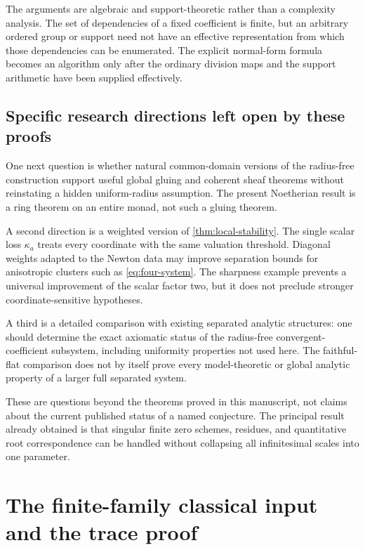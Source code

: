 \documentclass[11pt,letterpaper]{article}
\theoremstyle{definition}
\theoremstyle{remark}
\numberwithin{equation}{section}
\begin{document}
The arguments are algebraic and support-theoretic rather than a complexity analysis. The set of dependencies of a fixed coefficient is finite, but an arbitrary ordered group or support need not have an effective representation from which those dependencies can be enumerated. The explicit normal-form formula becomes an algorithm only after the ordinary division maps and the support arithmetic have been supplied effectively.

\subsection{Specific research directions left open by these proofs}
One next question is whether natural common-domain versions of the radius-free construction support useful global gluing and coherent sheaf theorems without reinstating a hidden uniform-radius assumption. The present Noetherian result is a ring theorem on an entire monad, not such a gluing theorem.

A second direction is a weighted version of \cref{thm:local-stability}. The single scalar loss $\kappa_a$ treats every coordinate with the same valuation threshold. Diagonal weights adapted to the Newton data may improve separation bounds for anisotropic clusters such as \eqref{eq:four-system}. The sharpness example prevents a universal improvement of the scalar factor two, but it does not preclude stronger coordinate-sensitive hypotheses.

A third is a detailed comparison with existing separated analytic structures: one should determine the exact axiomatic status of the radius-free convergent-coefficient subsystem, including uniformity properties not used here. The faithful-flat comparison does not by itself prove every model-theoretic or global analytic property of a larger full separated system.

These are questions beyond the theorems proved in this manuscript, not claims about the current published status of a named conjecture. The principal result already obtained is that singular finite zero schemes, residues, and quantitative root correspondence can be handled without collapsing all infinitesimal scales into one parameter.

\appendix
\section{The finite-family classical input and the trace proof}\label{app:classical-family}
\end{document}

